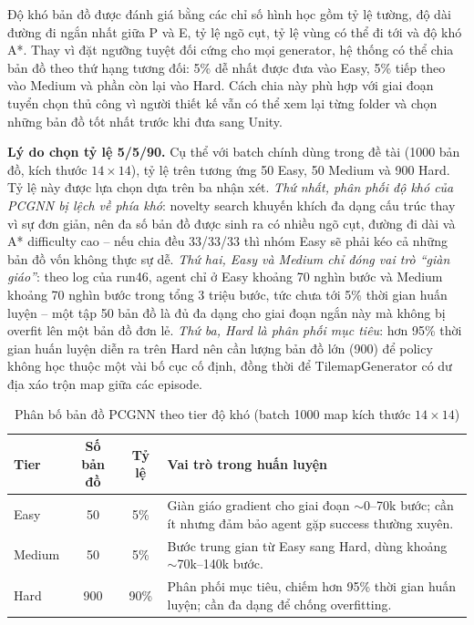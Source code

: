 Độ khó bản đồ được đánh giá bằng các chỉ số hình học gồm tỷ lệ tường, độ dài đường đi ngắn nhất giữa P và E, tỷ lệ ngõ cụt, tỷ lệ vùng có thể đi tới và độ khó A*. Thay vì đặt ngưỡng tuyệt đối cứng cho mọi generator, hệ thống có thể chia bản đồ theo thứ hạng tương đối: 5\% dễ nhất được đưa vào Easy, 5\% tiếp theo vào Medium và phần còn lại vào Hard. Cách chia này phù hợp với giai đoạn tuyển chọn thủ công vì người thiết kế vẫn có thể xem lại từng folder và chọn những bản đồ tốt nhất trước khi đưa sang Unity.

\textbf{Lý do chọn tỷ lệ 5/5/90.} Cụ thể với batch chính dùng trong đề tài (1000 bản đồ, kích thước $14\times14$), tỷ lệ trên tương ứng 50 Easy, 50 Medium và 900 Hard. Tỷ lệ này được lựa chọn dựa trên ba nhận xét. \textit{Thứ nhất, phân phối độ khó của PCGNN bị lệch về phía khó}: novelty search khuyến khích đa dạng cấu trúc thay vì sự đơn giản, nên đa số bản đồ được sinh ra có nhiều ngõ cụt, đường đi dài và A* difficulty cao -- nếu chia đều 33/33/33 thì nhóm Easy sẽ phải kéo cả những bản đồ vốn không thực sự dễ. \textit{Thứ hai, Easy và Medium chỉ đóng vai trò ``giàn giáo''}: theo log của run46, agent chỉ ở Easy khoảng 70 nghìn bước và Medium khoảng 70 nghìn bước trong tổng 3 triệu bước, tức chưa tới 5\% thời gian huấn luyện -- một tập 50 bản đồ là đủ đa dạng cho giai đoạn ngắn này mà không bị overfit lên một bản đồ đơn lẻ. \textit{Thứ ba, Hard là phân phối mục tiêu}: hơn 95\% thời gian huấn luyện diễn ra trên Hard nên cần lượng bản đồ lớn (900) để policy không học thuộc một vài bố cục cố định, đồng thời để TilemapGenerator có dư địa xáo trộn map giữa các episode.

\begin{table}[H]
    \centering
    \small
    \caption{Phân bố bản đồ PCGNN theo tier độ khó (batch 1000 map kích thước $14\times14$)}
    \label{tab:map_split}
    \begin{tabular}{|p{2.5cm}|c|c|p{7.5cm}|}
        \hline
        \textbf{Tier} & \textbf{Số bản đồ} & \textbf{Tỷ lệ} & \textbf{Vai trò trong huấn luyện} \\
        \hline
        Easy   & 50  & 5\%  & Giàn giáo gradient cho giai đoạn $\sim$0--70k bước; cần ít nhưng đảm bảo agent gặp success thường xuyên. \\
        \hline
        Medium & 50  & 5\%  & Bước trung gian từ Easy sang Hard, dùng khoảng $\sim$70k--140k bước. \\
        \hline
        Hard   & 900 & 90\% & Phân phối mục tiêu, chiếm hơn 95\% thời gian huấn luyện; cần đa dạng để chống overfitting. \\
        \hline
    \end{tabular}
\end{table}

